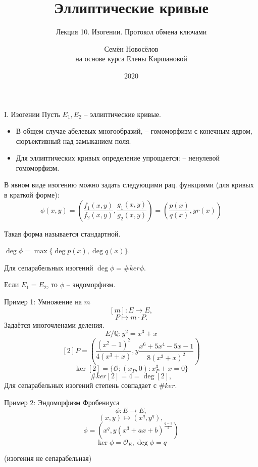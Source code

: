 \documentclass{beamer}
\title{Эллиптические кривые}
\subtitle{Лекция 10. Изогении. Протокол обмена ключами}
\author{Семён Новосёлов\\
\footnotesize{на основе курса Елены Киршановой}}
\institute{БФУ им. И. Канта}
\date{2020}
\begin{document}
\frame{\titlepage}


\begin{frame}{I. Изогении}
Пусть $E_1, E_2$ -- эллиптические кривые.

\begin{itemize}
    \item В общем случае абелевых многообразий,  -- гомоморфизм с конечным ядром, сюръективный над замыканием поля.
    \item Для эллиптических кривых определение упрощается:  -- ненулевой гомоморфизм.
\end{itemize}
\end{frame}

\begin{frame}
В явном виде изогению можно задать следующими рац. функциями (для кривых в краткой форме):
\[
\phi(x, y) = \left( \frac{f_1(x,y)}{f_2(x,y)}, \frac{g_1(x,y)}{g_2(x,y)} \right)
=
\left(
\frac{p(x)}{q(x)}, y r(x)
\right)
\]

Такая форма называется стандартной.

 $\deg\phi = \max\{\deg{p(x)}, \deg{q(x)}\}$.

Для сепарабельных изогений $\deg\phi = \#ker\phi$.

Если $E_1 = E_2$, то $\phi$ -- эндоморфизм.
\end{frame}

\begin{frame}{Пример 1: Умножение на $m$}
    \[[m]: E \rightarrow E,\]
    \[P \mapsto m \cdot P.\]
Задаётся многочленами деления.
\[E/\mathbb{Q}: y^2 = x^3 + x\]
\[
[2]P = \left( \frac{(x^2-1)^2}{4 (x^3 + x)}, y \frac{x^6 + 5 x^4 - 5 x - 1}{8 (x^3 + x)^2} \right)
\]
\[
\ker[2] = \{ \mathcal{O}; (x_P,0): x_P^3 + x = 0\}
\]
\[\#ker[2] = 4 = \deg[2],\]
Для сепарабельных изогений степень совпадает с $\#ker$.
\end{frame}

\begin{frame}{Пример 2: Эндоморфизм Фробениуса}
\[\phi: E \rightarrow E,\]
\[(x,y) \mapsto (x^q, y^q),\]
\[
\phi = (x^q, y (x^3 + a x + b)^{\frac{q-1}{2}})
\]
\[
\ker{\phi} = \mathcal{O}_E, \deg{\phi} = q
\]
\begin{center}
(изогения не сепарабельная)
\end{center}
\end{frame}
\end{document}
